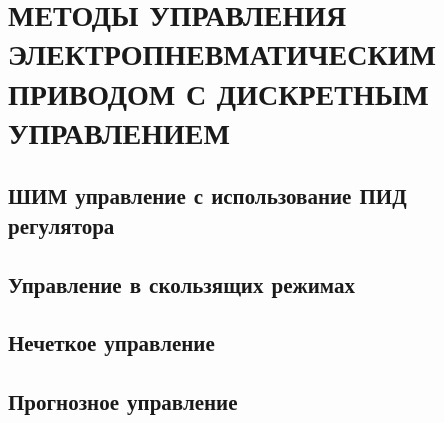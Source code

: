 \chapter{МЕТОДЫ УПРАВЛЕНИЯ ЭЛЕКТРОПНЕВМАТИЧЕСКИМ ПРИВОДОМ С ДИСКРЕТНЫМ УПРАВЛЕНИЕМ}\label{ch:ch3}

\section{ШИМ управление с использование ПИД регулятора}\label{sec:ch3/sec1}

\section{Управление в скользящих режимах}\label{sec:ch3/sec2}

\section{Нечеткое управление}\label{sec:ch3/sec3}

\section{Прогнозное управление}\label{sec:ch3/sec4}
